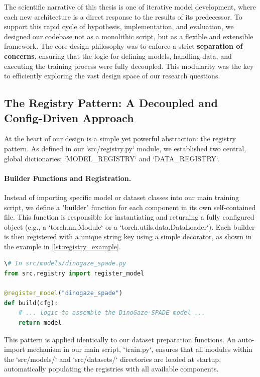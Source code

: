 The scientific narrative of this thesis is one of iterative model development, where each new architecture is a direct response to the results of its predecessor. To support this rapid cycle of hypothesis, implementation, and evaluation, we designed our codebase not as a monolithic script, but as a flexible and extensible framework. The core design philosophy was to enforce a strict \textbf{separation of concerns}, ensuring that the logic for defining models, handling data, and executing the training process were fully decoupled. This modularity was the key to efficiently exploring the vast design space of our research questions.

\subsection{The Registry Pattern: A Decoupled and Config-Driven Approach}
At the heart of our design is a simple yet powerful abstraction: the registry pattern. As defined in our `src/registry.py` module, we established two central, global dictionaries: `MODEL\_REGISTRY` and `DATA\_REGISTRY`.

\paragraph{Builder Functions and Registration.} Instead of importing specific model or dataset classes into our main training script, we define a "builder" function for each component in its own self-contained file. This function is responsible for instantiating and returning a fully configured object (e.g., a `torch.nn.Module` or a `torch.utils.data.DataLoader`). Each builder is then registered with a unique string key using a simple decorator, as shown in the example in \cref{lst:registry_example}.

\begin{lstlisting}[language=Python,
caption={Example of the registry pattern for a model builder function. A similar decorator, \texttt{@register\_data}, is used for datasets.},
label={lst:registry_example},
float=tp]
\# In src/models/dinogaze_spade.py
from src.registry import register_model

@register_model("dinogaze_spade")
def build(cfg):
    # ... logic to assemble the DinoGaze-SPADE model ...
    return model
\end{lstlisting}

This pattern is applied identically to our dataset preparation functions. An auto-import mechanism in our main script, `train.py`, ensures that all modules within the `src/models/` and `src/datasets/` directories are loaded at startup, automatically populating the registries with all available components.

